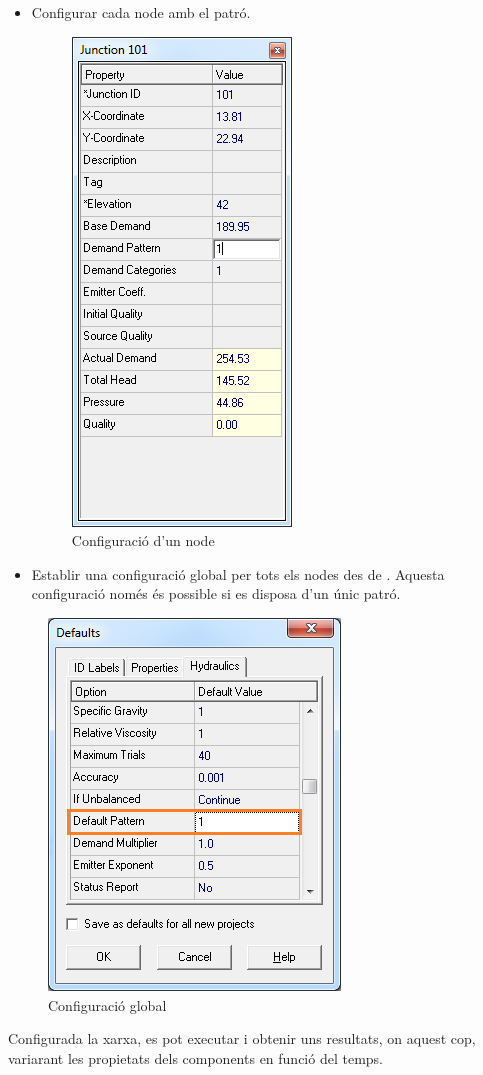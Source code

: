 \documentclass[12pt]{article}
\begin{document}
\begin{itemize}
	\item Configurar cada node amb el patró.
\begin{figure}[h!]
	\centering
	\includegraphics[scale=.5]{imatges/epanet/18.png}
	\caption{Configuració d'un node}
	\label{fig:confNodeAnode}
\end{figure}
	\item Establir una configuració global per tots els nodes des de . Aquesta configuració només és possible si es disposa d'un únic patró.
\end{itemize}
\begin{figure}[h!]
	\centering
	\includegraphics[scale=.5]{imatges/epanet/19.png}
	\caption{Configuració global}
	\label{fig:confGlobal}
\end{figure}
Configurada la xarxa, es pot executar i obtenir uns resultats, on aquest cop, variarant les propietats dels components en funció del temps.
\end{document}
